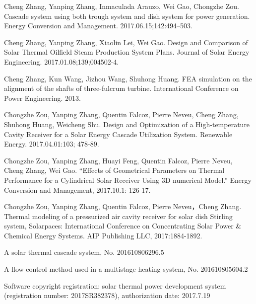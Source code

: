 \begin{publications}
  \item Cheng Zhang, Yanping Zhang, Inmaculada Arauzo, Wei Gao, Chongzhe  Zou. Cascade system using both trough system and dish system for power generation. Energy Conversion and Management. 2017.06.15;142:494–503.
  \item Cheng Zhang, Yanping Zhang, Xiaolin Lei, Wei Gao. Design and Comparison of Solar Thermal Oilfield Steam Production System Plans. Journal of Solar Energy Engineering. 2017.01.08;139;004502-4.
  \item Cheng Zhang, Kun Wang, Jizhou Wang, Shuhong Huang. FEA simulation on the alignment of the shafts of three-fulcrum turbine. International Conference on Power Engineering. 2013.
  \item Chongzhe Zou, Yanping Zhang, Quentin Falcoz, Pierre Neveu, Cheng Zhang, Shuhong Huang, Weicheng Shu. Design and Optimization of a High-temperature Cavity Receiver for a Solar Energy Cascade Utilization System. Renewable Energy. 2017.04.01:103; 478-89. 
  \item Chongzhe Zou, Yanping Zhang, Huayi Feng, Quentin Falcoz, Pierre Neveu, Cheng Zhang, Wei Gao. “Effects of Geometrical Parameters on Thermal Performance for a Cylindrical Solar Receiver Using 3D numerical Model.” Energy Conversion and Management, 2017.10.1: 126-17.
  \item Chongzhe Zou, Yanping Zhang, Quentin Falcoz, Pierre Neveu，Cheng Zhang. Thermal modeling of a pressurized air cavity receiver for solar dish Stirling system, Solarpaces: International Conference on Concentrating Solar Power \& Chemical Energy Systems. AIP Publishing LLC, 2017:1884-1892.
  
  \item A solar thermal cascade system, No. 201610806296.5
  \item A flow control method used in a multistage heating system, No. 201610805604.2
  \item Software copyright registration: solar thermal power development system (registration number: 2017SR382378), authorization date: 2017.7.19
  
\end{publications}

